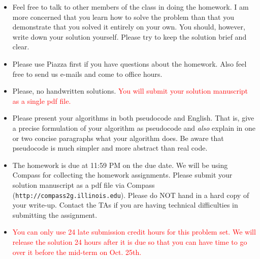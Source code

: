 
\usepackage{graphicx,amsmath,amssymb,url,epstopdf}
\usepackage{soul,xcolor}
\usepackage{color}

\sloppy
\newcommand{\ignore}[1]{}
\newcommand{\bx}{{\bf x}}
\newcommand{\bw}{{\bf w}}

\oddsidemargin 0in
\evensidemargin 0in
\textwidth 6.5in
\topmargin -0.5in
\textheight 9.0in

\newcommand{\bb}[1]{{\bf #1}}
\newcommand{\pp}{\noindent}
\newcommand{\ov}{\overline}
\renewcommand{\labelitemii}{\tiny$\circ$}





\begin{footnotesize}
\begin{itemize}
\item Feel free to talk to other members of the class in doing the homework.  I am
more concerned that you learn how to solve the problem than that you
demonstrate that you solved it entirely on your own.  You should, however,
write down your solution yourself.  Please try to keep the solution brief and
clear.

\item Please use Piazza first if you have questions about the homework.
  Also feel free to send us e-mails and come to office hours.

\item Please, no handwritten solutions. \textcolor{red}{You will submit your solution manuscript as a single pdf file.}

\item Please present your algorithms in both pseudocode and English.  That is, give
a precise formulation of your algorithm as pseudocode and {\em also} explain
in one or two concise paragraphs what your algorithm does.  Be aware that
pseudocode is much simpler and more abstract than real code. 

\item The homework is due at 11:59 PM on the due date. We will be using
Compass for collecting the homework assignments. Please submit your solution manuscript as a pdf file via Compass
(\texttt{http://compass2g.illinois.edu}). Please do NOT hand in a hard copy of your write-up.
Contact the TAs if you are having technical difficulties in
submitting the assignment.

\item \textcolor{red}{You can only use 24 late submission credit hours for this problem set. We will release the solution 24 hours after it is due so that you can have time to go over it before the mid-term on Oct. 25th.}

\end{itemize}
\end{footnotesize}


